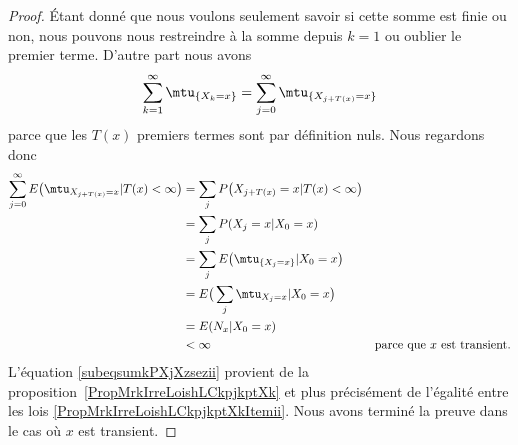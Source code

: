 \begin{proof}
	Étant donné que nous voulons seulement savoir si cette somme est finie ou non, nous pouvons nous restreindre à la somme depuis \( k=1\) ou oublier le premier terme. D'autre part nous avons
	\begin{equation}
		\sum_{k=1}^{\infty}\mtu_{\{ X_k=x \}}=\sum_{j=0}^{\infty}\mtu_{\{ X_{j+T(x)}=x \}}
	\end{equation}
	parce que les \( T(x)\) premiers termes sont par définition nuls. Nous regardons donc
	\begin{subequations}
		\begin{align}
			\sum_{j=0}^{\infty}E\big( \mtu_{X_{j+T(x)}=x}|T(x)<\infty \big) & =\sum_{j}P\big( X_{j+T(x)}=x|T(x)<\infty \big)                                                 \\
			                                                                & =\sum_jP(X_j=x|X_0=x)  \label{subeqsumkPXjXzsezii}                                             \\
			                                                                & =\sum_jE\big( \mtu_{\{ X_j=x \}}|X_0=x \big)                                                   \\
			                                                                & =E\big( \sum_j\mtu_{X_j=x}|X_0=x \big)                                                         \\
			                                                                & =E(N_x|X_0=x)                                                                                  \\
			                                                                & <\infty                                            & \text{parce que } x\text{ est transient.}
		\end{align}
	\end{subequations}
	L'équation \eqref{subeqsumkPXjXzsezii} provient de la proposition~\ref{PropMrkIrreLoishLCkpjkptXk} et plus précisément de l'égalité entre les lois \eqref{PropMrkIrreLoishLCkpjkptXkItemii}. Nous avons terminé la preuve dans le cas où \( x\) est transient.


\end{proof}
